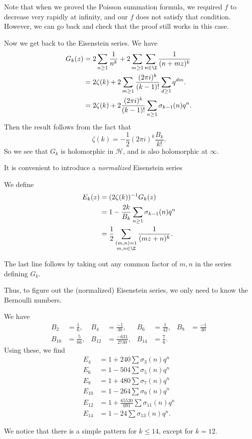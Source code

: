 \documentclass[a4paper]{article}
\renewcommand{\H}{\mathcal{H}}
\begin{document}
Note that when we proved the Poisson summation formula, we required $f$ to decrease very rapidly at infinity, and our $f$ does not satisfy that condition. However, we can go back and check that the proof still works in this case.

Now we get back to the Eisenstein series. We have
\begin{align*}
  G_k(z) &= 2 \sum_{n \geq 1} \frac{1}{n^k} + 2 \sum_{m \geq 1} \sum_{n \in \Z} \frac{1}{(n + mz)^k}\\
  &= 2 \zeta(k) + 2 \sum_{m \geq 1} \frac{(2\pi i )^k}{(k - 1)!} \sum_{d \geq 1} q^{dm}.\\
  &= 2 \zeta(k) + 2 \frac{(2\pi i)^k}{(k - 1)!} \sum_{n \geq 1} \sigma_{k - 1}(n) q^n.
\end{align*}
Then the result follows from the fact that
\[
  \zeta(k) = -\frac{1}{2} (2\pi i)^k \frac{B_k}{k!}.
\]
So we see that $G_k$ is holomorphic in $\H$, and is also holomorphic at $\infty$.

It is convenient to introduce a \emph{normalized} Eisenstein series
\begin{defi}
  We define
  \begin{align*}
    E_k(z) &= (2 \zeta(k))^{-1} G_k(z) \\
    &= 1 - \frac{2k}{B_k} \sum_{n \geq 1} \sigma_{k - 1}(n) q^n\\
    &= \frac{1}{2} \sum_{\substack{(m, n) = 1\\m , n \in \Z}} \frac{1}{(mz + n)^k}.
  \end{align*}
\end{defi}
The last line follows by taking out any common factor of $m, n$ in the series defining $G_k$.

Thus, to figure out the (normalized) Eisenstein series, we only need to know the Bernoulli numbers.
\begin{eg}
  We have
  \begin{align*}
    B_2 &= \frac{1}{6}, & B_4 &= \frac{-1}{30}, & B_6 &= \frac{1}{42}, & B_8 &= \frac{-1}{30}\\
    B_{10} &= \frac{5}{66}, & B_{12} &= \frac{-631}{2730}, & B_{14} &= \frac{7}{6}.
  \end{align*}
  Using these, we find
  \begin{align*}
    E_4 &= 1 + 240 \sum \sigma_3(n) q^n\\
    E_6 &= 1 - 504 \sum \sigma_5 (n) q^n\\
    E_8 &= 1 + 480 \sum \sigma_7(n) q^n\\
    E_{10} &= 1 - 264 \sum \sigma_9(n) q^n\\
    E_{12} &= 1 + \frac{65520}{691} \sum \sigma_{11}(n) q^n\\
    E_{14} &= 1 - 24 \sum \sigma_{13}(n) q^n.
  \end{align*}
\end{eg}
We notice that there is a simple pattern for $k \leq 14$, except for $k = 12$.
\end{document}
